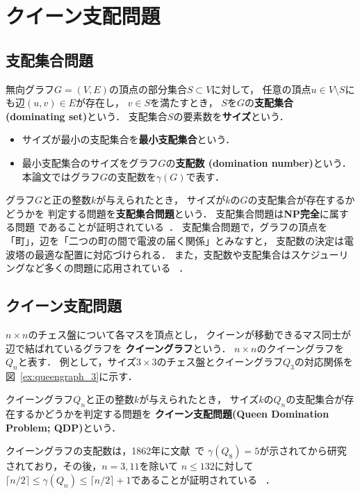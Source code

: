\chapter{クイーン支配問題}\label{chap:background}

\section{支配集合問題}
無向グラフ$G=(V,E)$の頂点の部分集合$S\subset V$に対して，
任意の頂点$u \in V\setminus S$にも辺$(u,v) \in E$が存在し，
$v \in S$を満たすとき，
$S$を$G$の\textbf{支配集合 (dominating set)}という．
支配集合$S$の要素数を\textbf{サイズ}という．
 \begin{itemize}
  \item サイズが最小の支配集合を\textbf{最小支配集合}という．
  \item 最小支配集合のサイズをグラフ$G$の\textbf{支配数 (domination number)}という．
    本論文ではグラフ$G$の支配数を$\gamma(G)$で表す．
 \end{itemize}

グラフ$G$と正の整数$k$が与えられたとき，
サイズが$k$の$G$の支配集合が存在するかどうかを
判定する問題を\textbf{支配集合問題}という．
支配集合問題は\textbf{NP完全}に属する問題
であることが証明されている~\cite{Jhonson79}．
支配集合問題で，グラフの頂点を「町」，辺を「二つの町の間で電波の届く関係」とみなすと，
支配数の決定は電波塔の最適な配置に対応づけられる．
また，支配数や支配集合はスケジューリングなど多くの問題に応用されている
~\cite{Haynes98,Haynes98Advanced}．

\section{クイーン支配問題}
$n\times n$のチェス盤について各マスを頂点とし，
クイーンが移動できるマス同士が辺で結ばれているグラフを
\textbf{クイーングラフ}という．
$n\times n$のクイーングラフを$Q_n$と表す．
例として，サイズ$3 \times 3$のチェス盤とクイーングラフ$Q_3$の対応関係を
図~\ref{ex:queengraph_3}に示す．

クイーングラフ$Q_n$と正の整数$k$が与えられたとき，
サイズ$k$の$Q_n$の支配集合が存在するかどうかを判定する問題を
\textbf{クイーン支配問題(Queen Domination Problem; QDP)}という． \par
クイーングラフの支配数は，1862年に文献~\cite{Jaenisch62}で
$\gamma(Q_8)=5$が示されてから研究されており，その後，$n=3,11$を除いて
$n \leq 132$に対して$\lceil n/2 \rceil \leq \gamma(Q_n) 
\leq \lceil n/2 \rceil +1 $であることが証明されている
~\cite{Ostergard01}．

